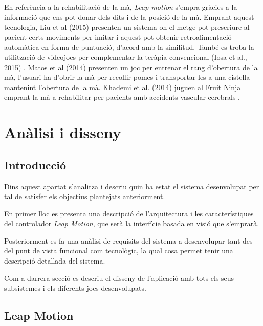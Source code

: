 \documentclass[12pt,a4paper,catalan]{article}
\begin{document}
	En referència a la rehabilitació de la mà, \textit{Leap motion} s'empra gràcies a la informació que ens pot donar dels dits i de la posició de la mà. Emprant aquest tecnologia, Liu et al (2015) \cite{liu-rehab} presenten un sistema on el metge pot prescriure al pacient certs moviments per imitar i aquest pot obtenir retroalimentació automàtica en forma de puntuació, d'acord amb la similitud. També es troba la utilització de videojocs per complementar la teràpia convencional (Iosa et al., 2015) \cite{losa-rehab}. Matos et al (2014) \cite{kinteract} presenten un joc per entrenar el rang d'obertura de la mà, l'usuari ha d'obrir la mà per recollir pomes i transportar-les a una cistella mantenint l'obertura de la mà. Khademi et al. (2014) juguen al Fruit Ninja emprant  la mà a rehabilitar per pacients amb accidents vascular cerebrals \cite{leap-fruit-ninja}.
	\section{Anàlisi i disseny}
	\subsection{Introducció}
	Dins aquest apartat s'analitza i descriu quin ha estat el sistema desenvolupat per tal de satisfer els objectius plantejats anteriorment.
	
	En primer lloc es presenta una descripció de l'arquitectura i les característiques del controlador \textit{Leap Motion}, que serà la interfície basada en visió que s'emprarà.
	
	Posteriorment es fa una anàlisi de requisits del sistema a desenvolupar tant des del punt de vista funcional com tecnològic, la qual cosa permet tenir una descripció detallada del sistema.
	
	Com a darrera secció es descriu el disseny de l'aplicació amb tots els seus subsistemes i els diferents jocs desenvolupats.
	\subsection{Leap Motion}
\end{document}
